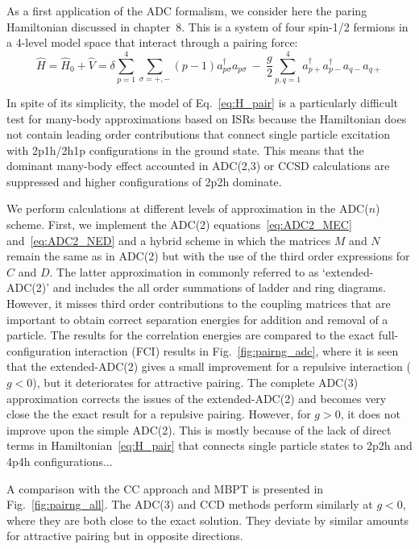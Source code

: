 As a first application of the ADC formalism, we consider here the paring Hamiltonian discussed in chapter~8. This is a system of  four spin-1/2 fermions in a 4-level model space that interact through a pairing force:
  \begin{equation}
   \widehat{H} = \widehat{H}_0 +  \widehat{V} = \delta \sum_{p=1}^4  \sum_{\sigma=+, -} (p-1) a^{\dagger}_{p \sigma} a_{p \sigma}
 ~-~ \frac{g}{2} \sum_{p, q=1}^4 a^{\dagger}_{p+}a^{\dagger}_{p-}  a_{q-}a_{q+}
\label{eq:H_pair}
\end{equation}


In spite of its simplicity,  the model of Eq.~\eqref{eq:H_pair} is a particularly difficult test for many-body approximations based on ISRs because the Hamiltonian does not contain leading order contributions that connect single particle excitation with 2p1h/2h1p configurations in the ground state. This means that the dominant many-body effect accounted in ADC(2,3) or CCSD calculations are suppressed and  higher configurations of 2p2h dominate.




We perform calculations at different levels of approximation in the ADC($n$) scheme. First, we implement the ADC(2) equations~\eqref{eq:ADC2_MEC} and~\eqref{eq:ADC2_NED} and a hybrid scheme in which the matrices $M$ and $N$ remain the same as in ADC(2) but with the use of the third order  expressions
for $C$ and $D$. The latter approximation in commonly referred to as `extended-ADC(2)' and includes the all order summations of ladder and ring diagrams. However, it misses third order contributions to the coupling matrices that are important to obtain correct separation energies  for addition and removal of a particle.  The results for the correlation energies are compared to the exact full-configuration interaction (FCI) results in Fig.~\ref{fig:pairng_adc}, where it is seen that the extended-ADC(2)
gives a small improvement for a repulsive  interaction ($g<0$), but it deteriorates for attractive pairing.
The complete ADC(3) approximation corrects the issues of the extended-ADC(2) and becomes very close the the exact result for a repulsive pairing. However, for $g>0$, it does not improve upon the simple ADC(2).  This is mostly because of the lack of direct terms in Hamiltonian~\eqref{eq:H_pair} that connects single particle states to 2p2h and 4p4h configurations...



A comparison with the CC approach and MBPT is presented in Fig.~\ref{fig:pairng_all}.
The ADC(3) and CCD methods perform similarly at $g<0$, where they are both close to the exact solution. They deviate by similar amounts for attractive pairing but in opposite directions.

